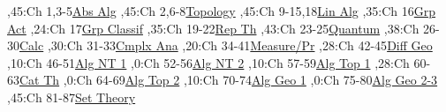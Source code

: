 
\bgroup
\renewcommand{\href}[1]{} %
\hypersetup{linkcolor=black} %
\renewcommand{\solidwidth}{0.7pt}
\renewcommand{\boldwidth}{1.5pt}

\setcounter{diagheight}{50}
\begin{chart}
,45:{Ch 1,3-5}{\hyperref[part:absalg]{Abs Alg}}{}
,45:{Ch 2,6-8}{\hyperref[part:basictop]{Topology}}{}
,45:{Ch 9-15,18}{\hyperref[part:linalg]{Lin Alg}}{}
,35:{Ch 16}{\hyperref[part:groups]{Grp Act}}{}
,24:{Ch 17}{\hyperref[chapter:sylow]{Grp Classif}}{}
,35:{Ch 19-22}{\hyperref[part:repth]{Rep Th}}{}
,43:{Ch 23-25}{\hyperref[part:quantum]{Quantum}}{}
,38:{Ch 26-30}{\hyperref[part:calc]{Calc}}{}
,30:{Ch 31-33}{\hyperref[part:cmplxana]{Cmplx Ana}}{}
,20:{Ch 34-41}{\hyperref[part:measure]{Measure/Pr}}{}
,28:{Ch 42-45}{\hyperref[part:diffgeo]{Diff Geo}}{}
,10:{Ch 46-51}{\hyperref[part:algnt1]{Alg NT 1}}{}
,0:{Ch 52-56}{\hyperref[part:algnt2]{Alg NT 2}}{}
,10:{Ch 57-59}{\hyperref[part:algtop1]{Alg Top 1}}{}
,28:{Ch 60-63}{\hyperref[part:cats]{Cat Th}}{}
,0:{Ch 64-69}{\hyperref[part:algtop2]{Alg Top 2}}{}
,10:{Ch 70-74}{\hyperref[part:ag1]{Alg Geo 1}}{}
,0:{Ch 75-80}{\hyperref[part:ag2]{Alg Geo 2-3}}{}
,45:{Ch 81-87}{\hyperref[part:st1]{Set Theory}}{}


\end{chart}
